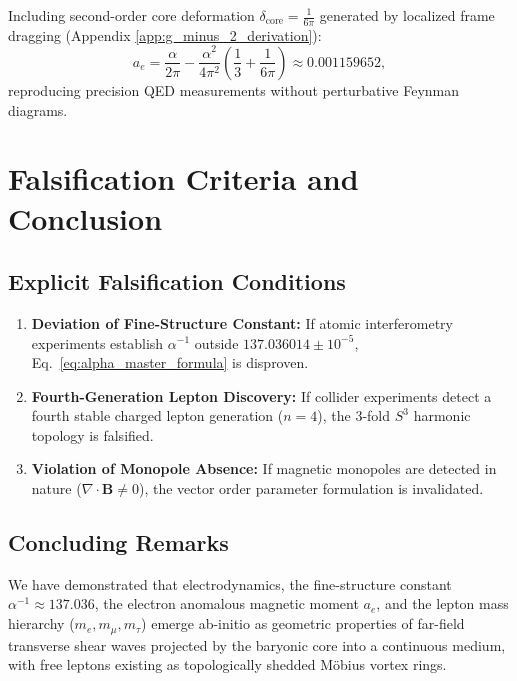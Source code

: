 \documentclass[11pt,a4paper]{article}
\begin{document}
	Including second-order core deformation $\delta_{\text{core}} = \frac{1}{6\pi}$ generated by localized frame dragging (Appendix \ref{app:g_minus_2_derivation}):
	\begin{equation}
		a_e = \frac{\alpha}{2\pi} - \frac{\alpha^2}{4\pi^2} \left( \frac{1}{3} + \frac{1}{6\pi} \right) \approx 0.001159652,
		\label{eq:ae_final_result}
	\end{equation}
	reproducing precision QED measurements without perturbative Feynman diagrams.
	
	\section{Falsification Criteria and Conclusion}
	\label{sec:falsification}
	
	\subsection{Explicit Falsification Conditions}
	\begin{enumerate}
		\item \textbf{Deviation of Fine-Structure Constant:} If atomic interferometry experiments establish $\alpha^{-1}$ outside $137.036014 \pm 10^{-5}$, Eq.\ \eqref{eq:alpha_master_formula} is disproven.
		\item \textbf{Fourth-Generation Lepton Discovery:} If collider experiments detect a fourth stable charged lepton generation ($n=4$), the 3-fold $S^3$ harmonic topology is falsified.
		\item \textbf{Violation of Monopole Absence:} If magnetic monopoles are detected in nature ($\nabla \cdot \mathbf{B} \neq 0$), the vector order parameter formulation is invalidated.
	\end{enumerate}
	
	\subsection{Concluding Remarks}
	We have demonstrated that electrodynamics, the fine-structure constant $\alpha^{-1} \approx 137.036$, the electron anomalous magnetic moment $a_e$, and the lepton mass hierarchy ($m_e, m_\mu, m_\tau$) emerge ab-initio as geometric properties of far-field transverse shear waves projected by the baryonic core into a continuous medium, with free leptons existing as topologically shedded Möbius vortex rings.
	
\end{document}
